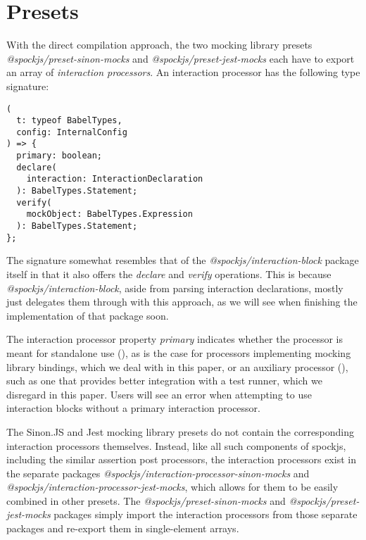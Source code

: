 \section{Presets}
With the direct compilation approach,
the two mocking library presets
\textit{@spockjs/preset-sinon-mocks} and
\textit{@spockjs/preset-jest-mocks}
each have to export an array of
\textit{interaction processors}.
An interaction processor has the following type signature:
\begin{verbatim}
(
  t: typeof BabelTypes,
  config: InternalConfig
) => {
  primary: boolean;
  declare(
    interaction: InteractionDeclaration
  ): BabelTypes.Statement;
  verify(
    mockObject: BabelTypes.Expression
  ): BabelTypes.Statement;
};
\end{verbatim}

The signature somewhat resembles that of
the \textit{@spockjs/interaction-block} package itself
in that it also offers the
\textit{declare} and \textit{verify} operations.
This is because \textit{@spockjs/interaction-block},
aside from parsing interaction declarations,
mostly just delegates them through with this approach,
as we will see when finishing the implementation of that package soon.

The interaction processor property \textit{primary} indicates
whether the processor is meant for standalone use (),
as is the case for processors implementing mocking library bindings,
which we deal with in this paper,
or an auxiliary processor (),
such as one that provides better integration with a test runner,
which we disregard in this paper.
Users will see an error when attempting to use interaction blocks
without a primary interaction processor.

The Sinon.JS and Jest mocking library presets
do not contain the corresponding interaction processors themselves.
Instead, like all such components of spockjs,
including the similar assertion post processors,
the interaction processors exist in the separate packages
\textit{@spockjs/interaction-processor-sinon-mocks} and
\textit{@spockjs/interaction-processor-jest-mocks},
which allows for them to be easily combined in other presets.
The \textit{@spockjs/preset-sinon-mocks} and
\textit{@spockjs/preset-jest-mocks} packages
simply import the interaction processors from those separate packages
and re-export them in single-element arrays.
